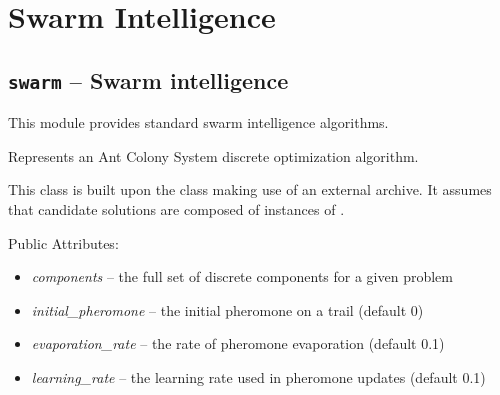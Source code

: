 \documentclass[letterpaper,10pt,english]{sphinxmanual}
\begin{document}
\section{Swarm Intelligence}
\label{reference:module-inspyred.swarm}\label{reference:swarm-intelligence}

\subsection{\texttt{swarm} -- Swarm intelligence}
\label{reference:swarm-swarm-intelligence}
This module provides standard swarm intelligence algorithms.

\begin{fulllineitems}
\label{reference:inspyred.swarm.ACS}
Represents an Ant Colony System discrete optimization algorithm.

This class is built upon the  class making
use of an external archive. It assumes that candidate solutions are
composed of instances of .

Public Attributes:
\begin{itemize}
\item {} 
\emph{components} -- the full set of discrete components for a given problem

\item {} 
\emph{initial\_pheromone} -- the initial pheromone on a trail (default 0)

\item {} 
\emph{evaporation\_rate} -- the rate of pheromone evaporation (default 0.1)

\item {} 
\emph{learning\_rate} -- the learning rate used in pheromone updates 
(default 0.1)

\end{itemize}

\end{fulllineitems}

\end{document}
